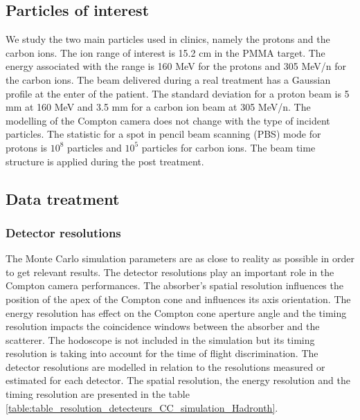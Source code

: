 \documentclass[11pt]{iopart}
\begin{document}
\subsection{Particles of interest}
\label{subsection:Particules_Etudiees_CC_hadrontherapy_Geant4}

We study the two main particles used in clinics, namely the protons and the carbon ions. The ion range of interest is 15.2 cm in the PMMA target. The energy associated with the range is 160 MeV for the protons and 305 MeV/n for the carbon ions. The beam delivered during a real treatment has a Gaussian profile at the enter of the patient. The standard deviation for a proton beam is 5 mm at 160 MeV and 3.5 mm for a carbon ion beam at 305 MeV/n. The modelling of the Compton camera does not change with the type of incident particles. The statistic for a spot in pencil beam scanning (PBS) mode for protons is $10^8$ particles and $10^5$ particles for carbon ions. The beam time structure is applied during the post treatment.\newline


\subsection{Data treatment}
\label{subsection:Treatment_data_CC_hadrontherapy_Geant4}

\subsubsection{Detector resolutions}
\label{subsubsection:Resolution_detector_CC_hadrontherapy_Geant4}

The Monte Carlo simulation parameters are as close to reality as possible in order to get relevant results. The detector resolutions play an important role in the Compton camera performances. The absorber's spatial resolution influences the position of the apex of the Compton cone and influences its axis orientation. The energy resolution has effect on the  Compton cone aperture angle and the timing resolution impacts the coincidence windows between the absorber and the scatterer. The hodoscope is not included in the simulation but its timing resolution is taking into account for the time of flight discrimination. The detector resolutions are modelled in relation to the resolutions measured or estimated for each detector. The spatial resolution, the energy resolution and the timing resolution are presented in the table \ref{table:table_resolution_detecteurs_CC_simulation_Hadronth}.
\end{document}
